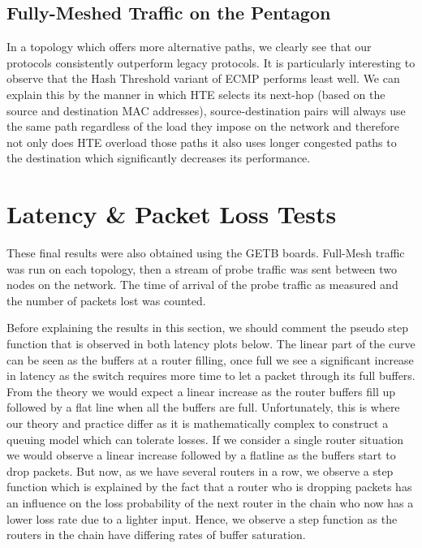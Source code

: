 
\subsection{Fully-Meshed Traffic on the Pentagon}

In a topology which offers more alternative paths, we clearly see that our protocols consistently outperform legacy protocols. It is particularly interesting to observe that the Hash Threshold variant of ECMP performs least well. We can explain this by the  manner in which HTE selects its next-hop (based on the source and destination MAC addresses), source-destination pairs will always use the same path regardless of the load they impose on the network and therefore not only does HTE overload those paths it also uses longer congested paths to the destination which significantly decreases its performance.



\section{Latency \& Packet Loss Tests}

These final results were also obtained using the GETB boards. Full-Mesh traffic was run on each topology, then a stream of probe traffic was sent between two nodes on the network. The time of arrival of the probe traffic as measured and the number of packets lost was counted.

Before explaining the results in this section, we should comment the pseudo step function that is observed in both latency plots below. The linear part of the curve can be seen as the buffers at a router filling, once full we see a significant increase in latency as the switch requires more time to let a packet through its full buffers. From the theory we would expect a linear increase as the router buffers fill up followed by a flat line when all the buffers are full. Unfortunately, this is where our theory and practice differ as it is mathematically complex to construct a queuing model which can tolerate losses. If we consider a single router situation we would observe a linear increase followed by a flatline as the buffers start to drop packets. But now, as we have several routers in a row, we observe a step function which is explained by the fact that a router who is dropping packets has an influence on the loss probability of the next router in the chain who now has a lower loss rate due to a lighter input. Hence, we observe a step function as the routers in the chain have differing rates of buffer saturation.

